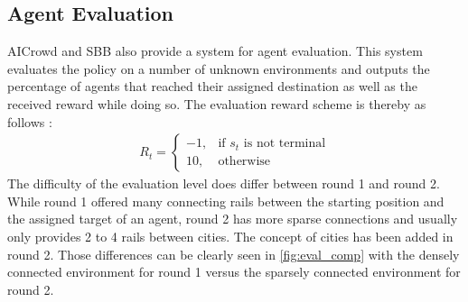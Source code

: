 \subsection*{Agent Evaluation}\label{rl_agent_eval}
AICrowd and SBB also provide a system for agent evaluation. This system evaluates the policy on a number of unknown environments and outputs the percentage of agents that reached their assigned destination as well as the received reward while doing so. The evaluation reward scheme is thereby as follows \cite{flatland_faq}:
\begin{gather*}
R_{t}= 
\begin{cases}
-1,				& \text{if } s_{t} \text{ is not terminal}\\
10,             & \text{otherwise}
\end{cases}
\end{gather*}
The difficulty of the evaluation level does differ between round 1 and round 2. While round 1 offered many connecting rails between the starting position and the assigned target of an agent, round 2 has more sparse connections and usually only provides 2 to 4 rails between cities. The concept of cities has been added in round 2. Those differences can be clearly seen in \autoref{fig:eval_comp} with the densely connected environment for round 1 versus the sparsely connected environment for round 2. 
